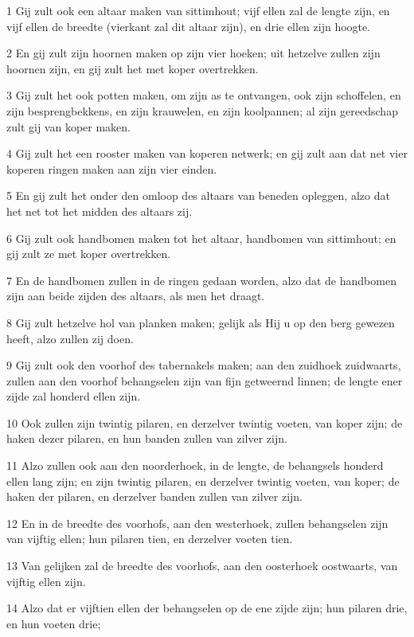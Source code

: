 \par 1 Gij zult ook een altaar maken van sittimhout; vijf ellen zal de lengte zijn, en vijf ellen de breedte (vierkant zal dit altaar zijn), en drie ellen zijn hoogte.
\par 2 En gij zult zijn hoornen maken op zijn vier hoeken; uit hetzelve zullen zijn hoornen zijn, en gij zult het met koper overtrekken.
\par 3 Gij zult het ook potten maken, om zijn as te ontvangen, ook zijn schoffelen, en zijn besprengbekkens, en zijn krauwelen, en zijn koolpannen; al zijn gereedschap zult gij van koper maken.
\par 4 Gij zult het een rooster maken van koperen netwerk; en gij zult aan dat net vier koperen ringen maken aan zijn vier einden.
\par 5 En gij zult het onder den omloop des altaars van beneden opleggen, alzo dat het net tot het midden des altaars zij.
\par 6 Gij zult ook handbomen maken tot het altaar, handbomen van sittimhout; en gij zult ze met koper overtrekken.
\par 7 En de handbomen zullen in de ringen gedaan worden, alzo dat de handbomen zijn aan beide zijden des altaars, als men het draagt.
\par 8 Gij zult hetzelve hol van planken maken; gelijk als Hij u op den berg gewezen heeft, alzo zullen zij doen.
\par 9 Gij zult ook den voorhof des tabernakels maken; aan den zuidhoek zuidwaarts, zullen aan den voorhof behangselen zijn van fijn getweernd linnen; de lengte ener zijde zal honderd ellen zijn.
\par 10 Ook zullen zijn twintig pilaren, en derzelver twintig voeten, van koper zijn; de haken dezer pilaren, en hun banden zullen van zilver zijn.
\par 11 Alzo zullen ook aan den noorderhoek, in de lengte, de behangsels honderd ellen lang zijn; en zijn twintig pilaren, en derzelver twintig voeten, van koper; de haken der pilaren, en derzelver banden zullen van zilver zijn.
\par 12 En in de breedte des voorhofs, aan den westerhoek, zullen behangselen zijn van vijftig ellen; hun pilaren tien, en derzelver voeten tien.
\par 13 Van gelijken zal de breedte des voorhofs, aan den oosterhoek oostwaarts, van vijftig ellen zijn.
\par 14 Alzo dat er vijftien ellen der behangselen op de ene zijde zijn; hun pilaren drie, en hun voeten drie;
